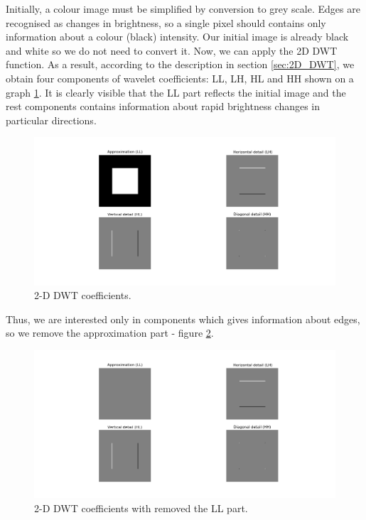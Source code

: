 Initially, a colour image must be simplified by conversion to grey scale. Edges are recognised as changes in brightness, so a single pixel should contains only information about a colour (black) intensity. Our initial image is already black and white so we do not need to convert it. Now, we can apply the 2D DWT function. As a result, according to the description in section \ref{sec:2D_DWT}, we obtain four components of wavelet coefficients: LL, LH, HL and HH shown on a graph \ref{fig:square_coeffs}. It is clearly visible that the LL part reflects the initial image and the rest components contains information about rapid brightness changes in particular directions. 

\begin{figure}[h]
	\centering
	\includegraphics[width=\textwidth]{graphs/square_db2_coeffs.png}
	\caption{2-D DWT coefficients.}
	\label{fig:square_coeffs}
\end{figure}

Thus, we are interested only in components which gives information about edges, so we remove the approximation part - figure \ref{fig:square_coeffs_d}.

\begin{figure}[h]
	\centering
	\includegraphics[width=\textwidth]{graphs/square_db2_coeffs_d.png}
	\caption{2-D DWT coefficients with removed the LL part.}
	\label{fig:square_coeffs_d}
\end{figure}

